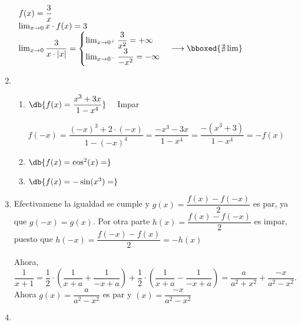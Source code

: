 \begin{enumerate}[label=\color{red}\textbf{\arabic*)}, leftmargin=*]
	$\begin{array}{l}
		f(x)=\dfrac{3}{x}\\
		\lim_{x\to0}x\cdot f(x)=3\\
		\lim_{x\to0}\dfrac{3}{x\cdot|x|}=\begin{cases}
			\lim_{x\to0^+}\dfrac{3}{x^2}=+\infty\\
			\lim_{x\to0^-}\dfrac{3}{-x^2}=-\infty
		\end{cases}\longrightarrow\bboxed{\nexists\lim}
	\end{array}$
	\item {}
	\begin{enumerate}[label=\color{red}\alph*)]
		\item $\db{f(x)=\dfrac{x^3+3x}{1-x^4}}\quad$ Impar
		
		$f(-x)=\dfrac{(-x)^3+2\cdot(-x)}{1-(-x)^4}=\dfrac{-x^3-3x}{1-x^4}=\dfrac{-(x^3+3)}{1-x^4}=-f(x)$
		\item $\db{f(x)=\cos^2(x)=}$
		\item $\db{f(x)=-\sin(x^3)=}$
	\end{enumerate}
	\item {}
	
	Efectivamene la igualdad se cumple y $g(x)=\dfrac{f(x)-f(-x)}{2}$ es par, ya que $g(-x)=g(x)$. Por otra parte $h(x)=\dfrac{f(x)-f(-x)}{2}$ es impar, puesto que $h(-x)=\dfrac{f(-x)-f(x)}{2}=-h(x)$
	
	Ahora, \[ \dfrac{1}{x+1} =\dfrac{1}{2}\cdot\left(\dfrac{1}{x+a}+\dfrac{1}{-x+a}\right)+\dfrac{1}{2}\cdot\left(\dfrac{1}{x+a}-\dfrac{1}{-x+a}\right)=\dfrac{a}{a^2+x^2}+\dfrac{-x}{a^2-x^2}.\] Ahora $g(x)=\dfrac{a}{a^2-x^2}$ es par y $(x)=\dfrac{-x}{a^2-x^2}$
	\item {}
	

\end{enumerate}
